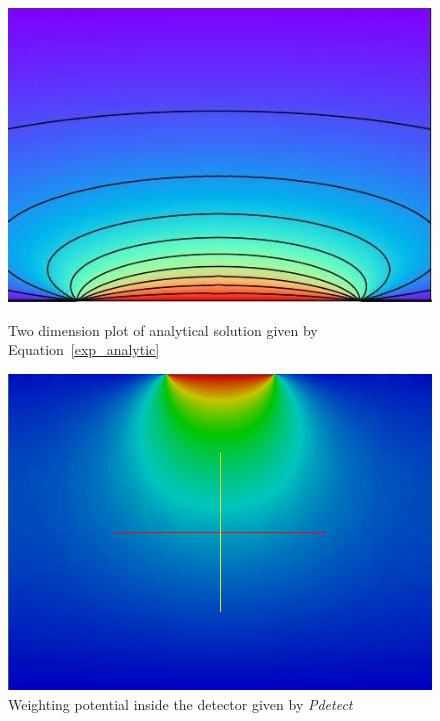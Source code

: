 \documentclass[11pt]{article}
\begin{document}
			\begin{figure}[H]
				\begin{minipage}[b]{.46\linewidth}
					\center
					\includegraphics[scale=0.5]{images/boundary_conditions/plot_analytic.jpg}
					\caption{Two dimension plot of analytical solution given by Equation~\ref{exp_analytic}}
					\label{fig:plot_analytic}
				\end{minipage} \hfill
				\begin{minipage}[b]{.46\linewidth}
				\center
					\includegraphics[scale=0.3]{images/boundary_conditions/w_semi_free_conditions.png}
					\caption{Weighting potential inside the detector given by \textit{Pdetect}}
					\label{fig:w_semi_free_conditions}
					\end{minipage}
			\end{figure}
\end{document}
